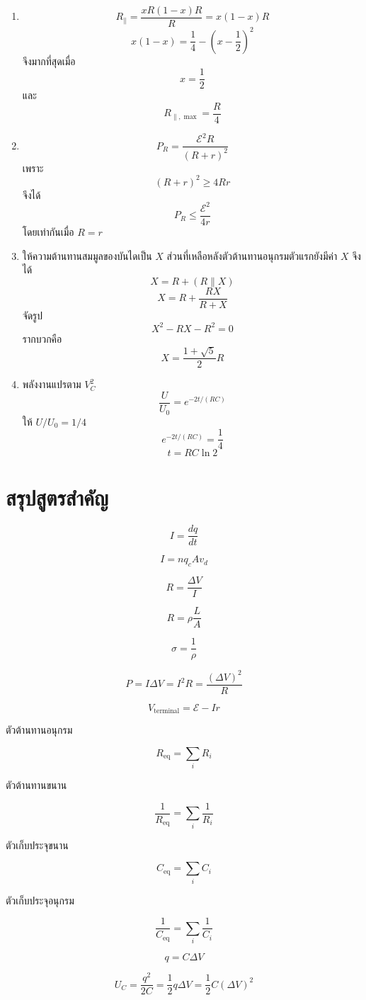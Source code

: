 \begin{enumerate}
    \item
    \[
    R_{\parallel}=\frac{xR(1-x)R}{R}=x(1-x)R
    \]
    \[
    x(1-x)=\frac14-\left(x-\frac12\right)^2
    \]
    จึงมากที่สุดเมื่อ
    \[
    x=\frac12
    \]
    และ
    \[
    R_{\parallel,\max}=\frac{R}{4}
    \]

    \item
    \[
    P_R=\frac{\mathcal{E}^2R}{(R+r)^2}
    \]
    เพราะ
    \[
    (R+r)^2\geq4Rr
    \]
    จึงได้
    \[
    P_R\leq\frac{\mathcal{E}^2}{4r}
    \]
    โดยเท่ากันเมื่อ $R=r$

    \item ให้ความต้านทานสมมูลของบันไดเป็น $X$ ส่วนที่เหลือหลังตัวต้านทานอนุกรมตัวแรกยังมีค่า $X$ จึงได้
    \[
    X=R+(R\parallel X)
    \]
    \[
    X=R+\frac{RX}{R+X}
    \]
    จัดรูป
    \[
    X^2-RX-R^2=0
    \]
    รากบวกคือ
    \[
    \boxed{X=\frac{1+\sqrt5}{2}R}
    \]

    \item พลังงานแปรตาม $V_C^2$
    \[
    \frac{U}{U_0}=e^{-2t/(RC)}
    \]
    ให้ $U/U_0=1/4$
    \[
    e^{-2t/(RC)}=\frac14
    \]
    \[
    \boxed{t=RC\ln2}
    \]
\end{enumerate}

\section{สรุปสูตรสำคัญ}

\begin{tcolorbox}[title={สรุป: กระแส ความต้านทาน และกำลัง}]
\[
I=\frac{dq}{dt}
\]

\[
I=nq_cAv_d
\]

\[
R=\frac{\Delta V}{I}
\]

\[
R=\rho\frac{L}{A}
\]

\[
\sigma=\frac{1}{\rho}
\]

\[
P=I\Delta V=I^2R=\frac{(\Delta V)^2}{R}
\]

\[
V_{\text{terminal}}=\mathcal{E}-Ir
\]
\end{tcolorbox}

\begin{tcolorbox}[title={สรุป: การรวมวงจรและตัวเก็บประจุ}]
ตัวต้านทานอนุกรม

\[
R_{\text{eq}}=\sum_iR_i
\]

ตัวต้านทานขนาน

\[
\frac{1}{R_{\text{eq}}}=\sum_i\frac{1}{R_i}
\]

ตัวเก็บประจุขนาน

\[
C_{\text{eq}}=\sum_iC_i
\]

ตัวเก็บประจุอนุกรม

\[
\frac{1}{C_{\text{eq}}}=\sum_i\frac{1}{C_i}
\]

\[
q=C\Delta V
\]

\[
U_C=\frac{q^2}{2C}=\frac12q\Delta V=\frac12C(\Delta V)^2
\]
\end{tcolorbox}


